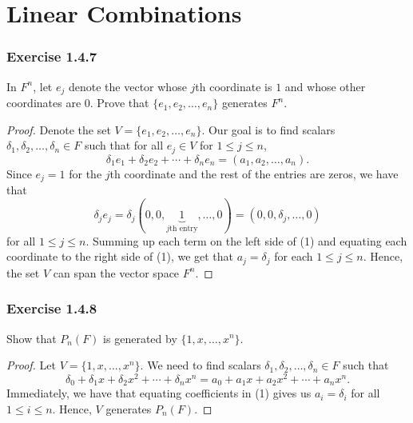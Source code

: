
\section{Linear Combinations}

\subsubsection{Exercise 1.4.7} In \( F^{n}  \), let \( e_{j}  \) denote the vector whose \( j \)th coordinate is \( 1  \) and whose other coordinates are 0. Prove that \( \{ e_{1}, e_{2}, \dots, e_{n} \}  \) generates \( F^{n} \).
\begin{proof}
Denote the set \( V = \{ e_{1}, e_{2}, \dots, e_{n} \}  \). Our goal is to find scalars \( \delta_{1}, \delta_{2} , \dots, \delta_{n} \in F  \) such that for all \( e_{j} \in V   \) for \( 1 \leq j \leq n  \), 
\[  \delta_{1} e_{1} + \delta_{2} e_{2} + \cdots + \delta_{n} e_{n} = (a_{1}, a_{2}, \dots, a_{n}). \tag{1} \]
Since \( e_{j} = 1  \) for the \( j \)th  coordinate and the rest of the entries are zeros, we have that 
\[  \delta_{j} e_{j} = \delta_{j} (0, 0, \underbrace{1}_{j\text{th entry} } , \dots, 0) = (0 , 0 , \delta_{j} , \dots , 0 ) \]  for all \( 1 \leq j \leq n  \).
Summing up each term on the left side of (1) and equating each coordinate to the right side of (1), we get that  \( a_{j} = \delta_{j}  \) for each \( 1 \leq j \leq n   \). Hence, the set \( V  \) can span the vector space \( F^{n}  \).

\end{proof}

\subsubsection{Exercise 1.4.8} Show that \( P_{n}(F) \) is generated by \( \{ 1 ,x , \dots , x^{n} \}  \).
\begin{proof}
Let \(  V = \{ 1 , x , \dots, x^{n} \}  \). We need to find scalars \( \delta_{1}, \delta_{2}, \dots, \delta_{n} \in F  \) such that 
\[ \delta_{0} + \delta_{1} x + \delta_{2} x^{2} + \cdots + \delta_{n} x^{n} = a_{0} + a_{1} x + a_{2} x^{2} + \cdots + a_{n} x^{n}.  \tag{1}       \]
Immediately, we have that equating coefficients in (1) gives us \( a_{i} = \delta_{i}  \) for all \( 1 \leq i \leq n  \). Hence, \( V  \) generates \( P_{n}(F) \). 
\end{proof}

